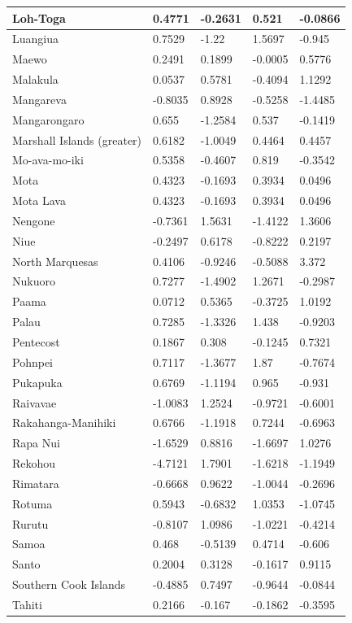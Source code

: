 \documentclass[draft,10pt]{article} %
\begin{document}
\begin{landscape}
\begin{longtable}{| p{2.6cm} |  p{2cm} | p{2cm}  | p{2cm}  | p{2cm}|}
Loh-Toga&0.4771&-0.2631&0.521&-0.0866\\ \hline
Luangiua&0.7529&-1.22&1.5697&-0.945\\ \hline
Maewo&0.2491&0.1899&-0.0005&0.5776\\ \hline
Malakula&0.0537&0.5781&-0.4094&1.1292\\ \hline
Mangareva&-0.8035&0.8928&-0.5258&-1.4485\\ \hline
Mangarongaro&0.655&-1.2584&0.537&-0.1419\\ \hline
Marshall Islands (greater)&0.6182&-1.0049&0.4464&0.4457\\ \hline
Mo-ava-mo-iki&0.5358&-0.4607&0.819&-0.3542\\ \hline
Mota&0.4323&-0.1693&0.3934&0.0496\\ \hline
Mota Lava&0.4323&-0.1693&0.3934&0.0496\\ \hline
Nengone&-0.7361&1.5631&-1.4122&1.3606\\ \hline
Niue&-0.2497&0.6178&-0.8222&0.2197\\ \hline
North Marquesas&0.4106&-0.9246&-0.5088&3.372\\ \hline
Nukuoro&0.7277&-1.4902&1.2671&-0.2987\\ \hline
Paama&0.0712&0.5365&-0.3725&1.0192\\ \hline
Palau&0.7285&-1.3326&1.438&-0.9203\\ \hline
Pentecost&0.1867&0.308&-0.1245&0.7321\\ \hline
Pohnpei&0.7117&-1.3677&1.87&-0.7674\\ \hline
Pukapuka&0.6769&-1.1194&0.965&-0.931\\ \hline
Raivavae&-1.0083&1.2524&-0.9721&-0.6001\\ \hline
Rakahanga-Manihiki&0.6766&-1.1918&0.7244&-0.6963\\ \hline
Rapa Nui&-1.6529&0.8816&-1.6697&1.0276\\ \hline
Rekohou&-4.7121&1.7901&-1.6218&-1.1949\\ \hline
Rimatara&-0.6668&0.9622&-1.0044&-0.2696\\ \hline
Rotuma&0.5943&-0.6832&1.0353&-1.0745\\ \hline
Rurutu&-0.8107&1.0986&-1.0221&-0.4214\\ \hline
Samoa&0.468&-0.5139&0.4714&-0.606\\ \hline
Santo&0.2004&0.3128&-0.1617&0.9115\\ \hline
Southern Cook Islands&-0.4885&0.7497&-0.9644&-0.0844\\ \hline
Tahiti&0.2166&-0.167&-0.1862&-0.3595\\ \hline

\end{longtable}
\end{landscape}
\end{document}

